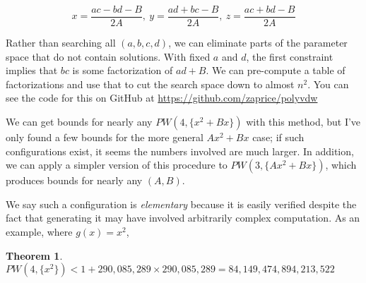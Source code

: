 \documentclass[a4paper]{amsproc}
\theoremstyle{plain}
\newtheorem{thm}{Theorem}[section]
\theoremstyle{named}
\begin{document}
$$x = \frac{ac-bd-B}{2A},\ y = \frac{ad+bc-B}{2A},\ z = \frac{ac+bd-B}{2A}$$

Rather than searching all $(a,b,c,d)$, we can eliminate parts of the parameter space that do not contain solutions.
With fixed $a$ and $d$, the first constraint implies that $bc$ is some factorization of $ad + B$.
We can pre-compute a table of factorizations and use that to cut the search space down to almost $n^2$.
You can see the code for this on GitHub at \url{https://github.com/zaprice/polyvdw}

We can get bounds for nearly any $PW(4,\{x^2+Bx\})$ with this method,
but I've only found a few bounds for the more general $Ax^2+Bx$ case;
if such configurations exist, it seems the numbers involved are much larger.
In addition, we can apply a simpler version of this procedure to $PW(3,\{Ax^2+Bx\})$,
which produces bounds for nearly any $(A, B)$.

We say such a configuration is \textit{elementary} because it is easily verified despite the fact that generating it may have involved arbitrarily complex computation.
As an example, where $g(x)=x^2$,

\begin{thm}
$ PW(4, \{x^2\}) < 1+290{,}085{,}289\times 290{,}085{,}289 = 84{,}149{,}474{,}894{,}213{,}522$
\end{thm}
\end{document}
